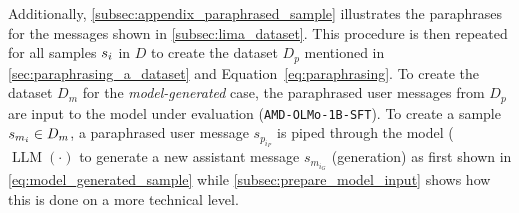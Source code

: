 Additionally, \autoref{subsec:appendix_paraphrased_sample} illustrates the paraphrases for the messages shown in \autoref{subsec:lima_dataset}. This procedure is then repeated for all samples $s_i$ in $D$ to create the dataset $D_p$ mentioned in \autoref{sec:paraphrasing_a_dataset} and Equation~\ref{eq:paraphrasing}. To create the dataset $D_m$ for the \emph{model-generated} case, the paraphrased user messages from $D_p$ are input to the model under evaluation (\texttt{AMD-OLMo-1B-SFT}). To create a sample $s_{m_i} \in D_m$, a paraphrased user message $s_{p_{i_P}}$ is piped through the model ($\operatorname{LLM}(\cdot)$ to generate a new assistant message $s_{m_{i_G}}$ (generation) as first shown in \autoref{eq:model_generated_sample} while \autoref{subsec:prepare_model_input} shows how this is done on a more technical level.

